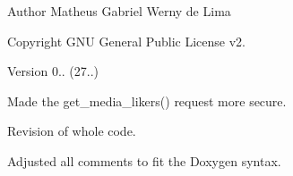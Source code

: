 \begin{DoxyAuthor}{Author}
Matheus Gabriel Werny de Lima 
\end{DoxyAuthor}
\begin{DoxyCopyright}{Copyright}
G\+NU General Public License v2. 
\end{DoxyCopyright}
\begin{DoxyVersion}{Version}
0.. (27..)
\begin{DoxyItemize}
\item Made the get\+\_\+media\+\_\+likers() request more secure.
\item Revision of whole code.
\item Adjusted all comments to fit the Doxygen syntax. 
\end{DoxyItemize}
\end{DoxyVersion}
